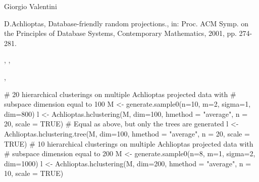 \documentclass{article}
\begin{document}
\begin{Author}\relax
Giorgio Valentini 
\end{Author}
\begin{References}\relax
D.Achlioptas, Database-friendly random projections., in: Proc. ACM Symp. on
the Principles of Database Systems, Contemporary Mathematics, 2001, pp. 274-281.
\end{References}
\begin{SeeAlso}\relax
{}, , 

,
\end{SeeAlso}
\begin{Examples}
\begin{ExampleCode}
# 20 hierarchical clusterings on multiple Achlioptas projected data with 
# subspace dimension equal to 100
M <- generate.sample0(n=10, m=2, sigma=1, dim=800)
l <- Achlioptas.hclustering(M, dim=100, hmethod = "average", n = 20, scale = TRUE)
# Equal as above, but only the trees are generated
l <- Achlioptas.hclustering.tree(M, dim=100, hmethod = "average", n = 20, scale = TRUE)
# 10 hierarchical clusterings on multiple Achlioptas projected data with 
# subspace dimension equal to 200
M <- generate.sample0(n=8, m=1, sigma=2, dim=1000)
l <- Achlioptas.hclustering(M, dim=200, hmethod = "average", n = 10, scale = TRUE)
\end{ExampleCode}
\end{Examples}
\end{document}
